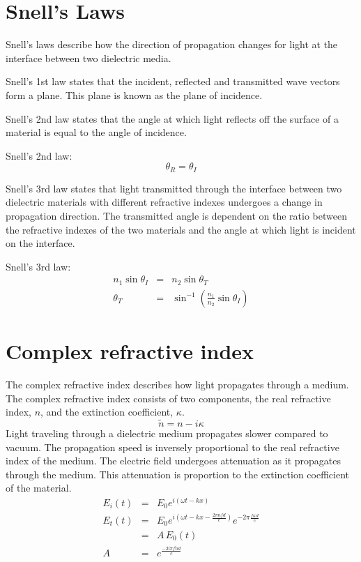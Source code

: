\section{Snell's Laws}
\label{sec:Snell}
Snell's laws describe how the direction of propagation changes for light at the interface between two dielectric media.

Snell's 1st law states that the incident, reflected and transmitted wave vectors form a plane. This plane is known as the plane of incidence.

Snell's 2nd law states that the angle at which light reflects off the surface of a material is equal to the angle of incidence.

Snell's 2nd law:
\begin{equation}
\theta_{R} = \theta_{I}
\label{eq:Snell2}
\end{equation}

Snell's 3rd law states that light transmitted through the interface between two dielectric materials with different refractive indexes undergoes a change in propagation direction. The transmitted angle is dependent on the ratio between the refractive indexes of the two materials and the angle at which light is incident on the interface.

Snell's 3rd law:
\begin{eqnarray}
n_{1}\sin{\theta_{I}} &=& n_{2}\sin{\theta_{T}}\\
\theta_{T} &=& \sin^{-1}{\left(\frac{n_{1}}{n_{2}}\sin{\theta_{I}}\right)}
\label{eq:Snell3}
\end{eqnarray}

\section{Complex refractive index}
\label{sec:Attenuation}

The complex refractive index describes how light propagates through a medium. The complex refractive index consists of two components, the real refractive index, $n$, and the extinction coefficient, $\kappa$.
\begin{equation}
\widetilde{n}  = n - i\kappa
\label{eq:compref}
\end{equation}
Light traveling through a dielectric medium propagates slower compared to vacuum. The propagation speed is inversely proportional to the real refractive index of the medium. The electric field undergoes attenuation as it propagates through the medium. This attenuation is proportion to the extinction coefficient of the material.
\begin{eqnarray}
E_{i}(t) &=& E_{0}e^{i(\omega t - kx)}\label{eq:Travel11}\\
E_{t}(t) &=& E_{0}e^{i(\omega t - kx - \frac{2\pi nfd}{c})}e^{-2\pi\frac{f\kappa d}{c}}\label{eq:Travel21}\\
&=& A\, E_{0}(t)\label{eq:Travel31}\\
A &=& e^{\frac{-2i\pi f\widetilde{n}d}{c}}\label{eq:Travel41}
\end{eqnarray}

